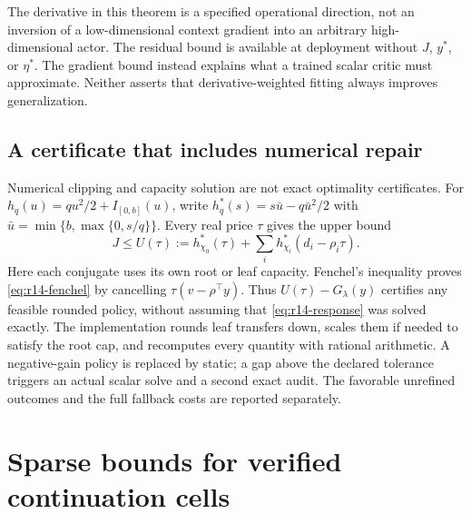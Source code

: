 \documentclass[11pt,letterpaper]{article}
\theoremstyle{definition}
\newcommand{\1}{\mathbf 1}
\begin{document}
The derivative in this theorem is a specified operational direction, not an inversion of a low-dimensional context gradient into an arbitrary high-dimensional actor. The residual bound is available at deployment without $J$, $y^*$, or $\eta^*$. The gradient bound instead explains what a trained scalar critic must approximate. Neither asserts that derivative-weighted fitting always improves generalization.

\subsection{A certificate that includes numerical repair}
Numerical clipping and capacity solution are not exact optimality certificates. For $h_q(u)=qu^2/2+I_{[0,b]}(u)$, write
$h_q^*(s)=s\bar u-q\bar u^2/2$ with $\bar u=\min\{b,\max\{0,s/q\}\}$. Every real price $\tau$ gives the upper bound
\begin{equation}\label{eq:r14-fenchel}
 J\leq U(\tau):=h_{\chi_0}^*(\tau)+\sum_i h_{\chi_i}^*(d_i-\rho_i\tau).
\end{equation}
Here each conjugate uses its own root or leaf capacity. Fenchel's inequality proves \eqref{eq:r14-fenchel} by cancelling $\tau(v-\rho^\top y)$. Thus $U(\tau)-G_\lambda(y)$ certifies any feasible rounded policy, without assuming that \eqref{eq:r14-response} was solved exactly. The implementation rounds leaf transfers down, scales them if needed to satisfy the root cap, and recomputes every quantity with rational arithmetic. A negative-gain policy is replaced by static; a gap above the declared tolerance triggers an actual scalar solve and a second exact audit. The favorable unrefined outcomes and the full fallback costs are reported separately.



\section{Sparse bounds for verified continuation cells}\label{ec:r24-sparse}
\end{document}

